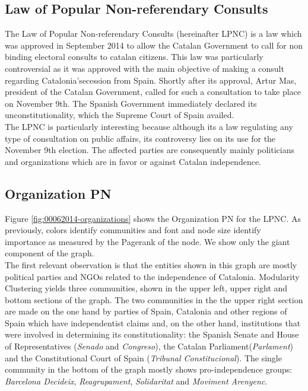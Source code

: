 \subsection{Law of Popular Non-referendary Consults}\label{subsec:lpnc}

The Law of Popular Non-referendary Consults (hereinafter LPNC) is a law which was approved in September 2014 to allow the Catalan Government to call for non binding electoral consults to catalan citizens. This law was particularly controversial as it was approved with the main objective of making a consult regarding Catalonia'secession from Spain. Shortly after its approval, Artur Mas, president of the Catalan Government, called for such a consultation to take place on November 9th. The Spanish Government immediately declared its unconstitutionality, which the Supreme Court of Spain availed. \\

The LPNC is particularly interesting because although its a law regulating any type of consultation on public affairs, its controversy lies on its use for the November 9th election. The affected parties are consequently mainly politicians and organizations which are in favor or against Catalan independence.\\

\subsection{Organization PN}\label{subsec:lpnc-organization-organization}

Figure \ref{fig:00062014-organizations} shows the Organization PN for the LPNC. As previously, colors identify communities and font and node size identify importance as measured by the Pagerank of the node. We show only the giant component of the graph.\\


The first relevant observation is that the entities shown in this graph are mostly political parties and NGOs related to the independence of Catalonia. Modularity Clustering yields three communities, shown in the upper left, upper right and bottom sections of the graph. The two communities in the the upper right section are made on the one hand by parties of Spain, Catalonia and other regions of Spain which have independentist claims and, on the other hand, institutions that were involved in determining its constitutionality: the Spanish Senate and House of Representatives (\emph{Senado} and \emph{Congreso}), the Catalan Parliament(\emph{Parlament}) and the Constitutional Court of Spain (\emph{Tribunal Constitucional}). The single community in the bottom of the graph mostly shows pro-independence groups: \emph{Barcelona Decideix}, \emph{Reagrupament}, \emph{Solidaritat} and \emph{Moviment Arenyenc}. \\


